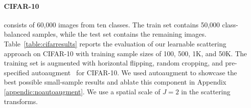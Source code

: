 \documentclass[10pt,twocolumn,letterpaper]{article}
\begin{document}
\paragraph{CIFAR-10} \hspace{-8pt}
consists of 60,000 images from ten classes. The train set contains 50,000 class-balanced samples, while the test set contains the remaining images. Table~\ref{table:cifarresults} reports the evaluation of our learnable scattering approach on CIFAR-10 with training sample sizes of 100, 500, 1K, and 50K. The training set is augmented with horizontal flipping, random cropping, and pre-specified autoaugment~\cite{autoaugment} for CIFAR-10. We used autoaugment \cite{autoaugment} to showcase the best possible small-sample results and ablate this component in Appendix \ref{appendic:noautoaugment}. We use a spatial scale of $J=2$ in the scattering transforms. 
\end{document}
